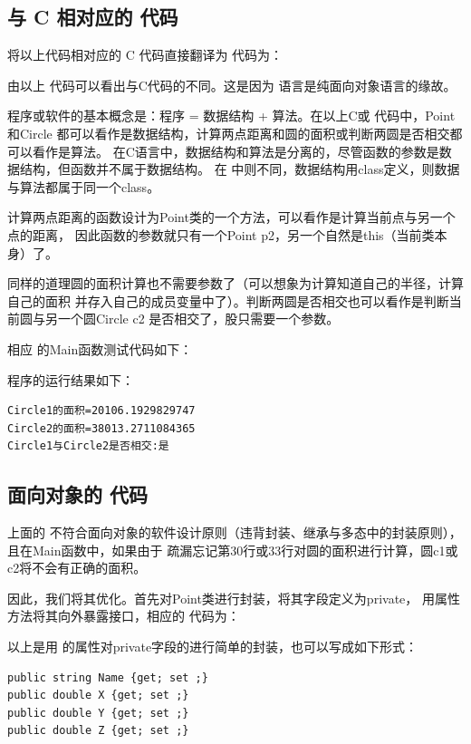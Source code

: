 \subsection{与 C 相对应的 \cs 代码}

将以上代码相对应的 C 代码直接翻译为 \cs 代码为：



由以上 \cs 代码可以看出与C代码的不同。这是因为 \cs 语言是纯面向对象语言的缘故。

程序或软件的基本概念是：程序 = 数据结构 + 算法。在以上C或 \cs 代码中，Point和Circle
都可以看作是数据结构，计算两点距离和圆的面积或判断两圆是否相交都可以看作是算法。
在C语言中，数据结构和算法是分离的，尽管函数的参数是数据结构，但函数并不属于数据结构。
在 \cs 中则不同，数据结构用class定义，则数据与算法都属于同一个class。

计算两点距离的函数设计为Point类的一个方法，可以看作是计算当前点与另一个点的距离，
因此函数的参数就只有一个Point p2，另一个自然是this（当前类本身）了。

同样的道理圆的面积计算也不需要参数了（可以想象为计算知道自己的半径，计算自己的面积
并存入自己的成员变量中了）。判断两圆是否相交也可以看作是判断当前圆与另一个圆Circle c2
是否相交了，股只需要一个参数。

相应 \cs 的Main函数测试代码如下：



程序的运行结果如下：
\begin{verbatim}
Circle1的面积=20106.1929829747
Circle2的面积=38013.2711084365
Circle1与Circle2是否相交:是
\end{verbatim}

\subsection{面向对象的 \cs 代码}
上面的 \cs 不符合面向对象的软件设计原则（违背封装、继承与多态中的封装原则），且在Main函数中，如果由于
疏漏忘记第30行或33行对圆的面积进行计算，圆c1或c2将不会有正确的面积。

因此，我们将其优化。首先对Point类进行封装，将其字段定义为private，
用属性方法将其向外暴露接口，相应的 \cs 代码为：



以上是用 \cs 的属性对private字段的进行简单的封装，也可以写成如下形式：
\begin{lstlisting}
public string Name {get; set ;}
public double X {get; set ;}
public double Y {get; set ;}
public double Z {get; set ;}
\end{lstlisting}

